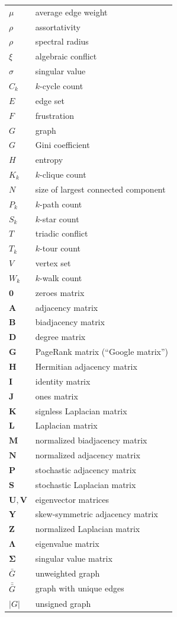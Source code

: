 \documentclass{article}
\begin{document}
\begin{longtable}{ll}
  $\mu$ & average edge weight \\
  $\rho$ & assortativity \\
  $\rho$ & spectral radius \\
  $\xi$ & algebraic conflict \\
  $\sigma$ & singular value \\
\midrule
  $C_k$ & $k$-cycle count \\
  $E$ & edge set \\
  $F$ & frustration \\
  $G$ & graph \\
  $G$ & Gini coefficient \\
  $H$ & entropy \\
  $K_k$ & $k$-clique count \\
  $N$   & size of largest connected component\\
  $P_k$ & $k$-path count \\
  $S_k$ & $k$-star count \\
  $T$   & triadic conflict \\
  $T_k$ & $k$-tour count \\
  $V$   & vertex set \\
  $W_k$ & $k$-walk count \\
\midrule
  $\mathbf 0$ & zeroes matrix \\
  $\mathbf A$ & adjacency matrix \\
  $\mathbf B$ & biadjacency matrix \\
  $\mathbf D$ & degree matrix \\
  $\mathbf G$ & PageRank matrix (``Google matrix'') \\
  $\mathbf H$ & Hermitian adjacency matrix \\
  $\mathbf I$ & identity matrix \\
  $\mathbf J$ & ones matrix \\
  $\mathbf K$ & signless Laplacian matrix \\
  $\mathbf L$ & Laplacian matrix \\
  $\mathbf M$ & normalized biadjacency matrix \\
  $\mathbf N$ & normalized adjacency matrix \\
  $\mathbf P$ & stochastic adjacency matrix \\
  $\mathbf S$ & stochastic Laplacian matrix \\
  $\mathbf U, \mathbf V$ & eigenvector matrices \\
  $\mathbf Y$ & skew-symmetric adjacency matrix \\
  $\mathbf Z$ & normalized Laplacian matrix \\
\midrule
  $\mathbf \Lambda$ & eigenvalue matrix \\
  $\mathbf \Sigma$ & singular value matrix \\
\midrule
  $\bar G$ & unweighted graph \\
  $\bar{\bar G}$ & graph with unique edges \\
  $|G|$ & unsigned graph 
\end{longtable}
\end{document}
